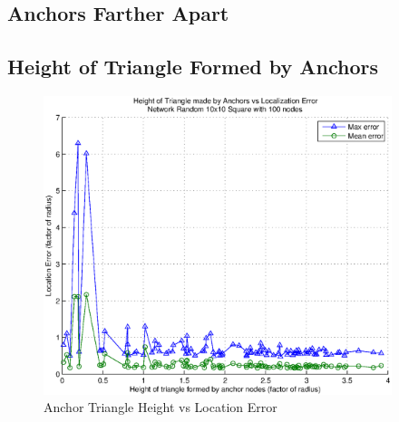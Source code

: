 \subsection{Anchors Farther Apart}


\subsection{Height of Triangle Formed by Anchors}

\begin{figure}
  \centering
    \includegraphics[width=4in]{figures/AnchorTriangleHeightVsError-Random-10x10-Square-with-100-nodes.eps}
    \caption{Anchor Triangle Height vs Location Error}
    \label{fig:Height1}
\end{figure}

